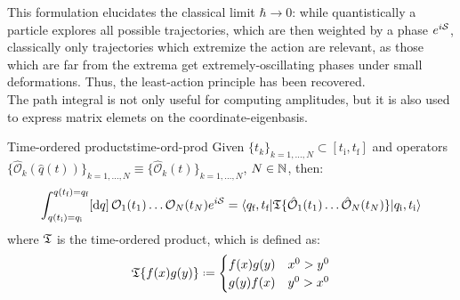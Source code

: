 This formulation elucidates the classical limit $ \hbar \rightarrow 0 $: while quantistically a particle explores all possible trajectories, which are then weighted by a phase $ e^{i\mathcal{S}} $, classically only trajectories which extremize the action are relevant, as those which are far from the extrema get extremely-oscillating phases under small deformations. Thus, the least-action principle has been recovered. \\
The path integral is not only useful for computing amplitudes, but it is also used to express matrix elemets on the coordinate-eigenbasis.

\begin{lemma}{Time-ordered products}{time-ord-prod}
  Given $ \{t_k\}_{k = 1, \dots, N} \subset [t_\text{i} , t_\text{f}] $ and operators $ \{\hat{\mathcal{O}}_k(\hat{q}(t))\}_{k = 1, \dots, N} \equiv \{\hat{\mathcal{O}}_k(t)\}_{k = 1, \dots, N} $, $ N \in \mathbb{N} $, then:
  \begin{equation}
    \int_{q(t_\text{i}) = q_\text{i}}^{q(t_\text{f}) = q_\text{f}} [\mathrm{d} q]\, \mathcal{O}_1(t_1) \dots \mathcal{O}_N(t_N) e^{i \mathcal{S}} = \braket{q_\text{f},t_\text{f} | \mathfrak{T}\{\hat{\mathcal{O}}_1(t_1) \dots \hat{\mathcal{O}}_N(t_N)\} | q_\text{i},t_\text{i}}
  \end{equation}
  where $ \mathfrak{T} $ is the time-ordered product, which is defined as:
  \begin{equation}
    \tempord \{f(x) g(y)\} \defeq
    \begin{cases}
      f(x) g(y) & x^0 > y^0 \\
      g(y) f(x) & y^0 > x^0
    \end{cases}
  \end{equation}
\end{lemma}

